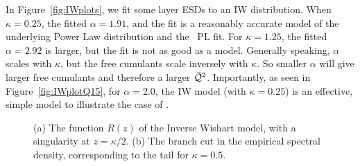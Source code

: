 In Figure~\ref{fig:IWplots}, we fit some \Typical layer ESDs to an IW distribution.
When $\kappa=0.25$, the fitted $\alpha=1.91$, and the fit is a reasonably accurate model of the underlying Power Law
distribution and the ~\WW PL fit.
For  $\kappa=1.25$, the fitted $\alpha=2.92$ is larger, but the fit is not as good as a
model. Generally speaking, $\alpha$ scales with $\kappa$, but the  free cumulants scale inversely with $\kappa$.
So smaller $\alpha$ will give larger free cumulants and therefore a larger $\bar{\mathcal{Q}}^{2}$.
Importantly, as seen in Figure~\ref{fig:IWplotQ15}, for $\alpha= 2.0$, the IW model (with $\kappa=0.25$)
is an effective, simple model to illustrate the \SETOL case of \IdealLearning.

\begin{figure}[t]
    \centering
    \caption{(a) The function $R(z)$ of the Inverse Wishart model, with a singularity at $z = \kappa/2$. (b) The branch cut in the empirical spectral density, corresponding to the tail for $\kappa = 0.5$.}
    \label{fig:R_branch_cut_combined}
\end{figure}

